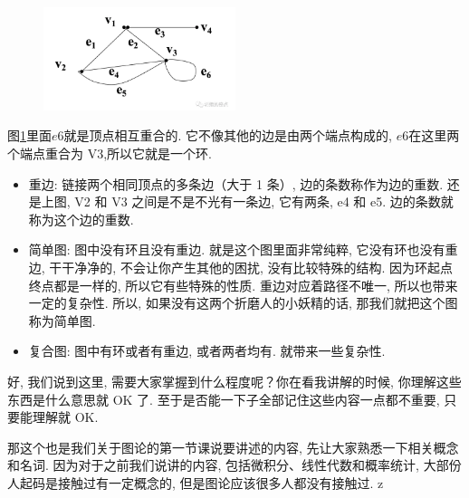 \begin{figure}[ht]
  \centering
  \includegraphics[width=0.5\textwidth]{asset/20231227144939.png}
  \caption{}
  \label{fig:img24_8}
\end{figure}

图\ref{fig:img24_8}里面$e6$就是顶点相互重合的. 它不像其他的边是由两个端点构成的, $e6$在这里两个端点重合为 V3,所以它就是一个环. 

\begin{itemize}
  \item 重边: 链接两个相同顶点的多条边（大于 1 条）, 边的条数称作为边的重数. 还是上图, V2 和 V3 之间是不是不光有一条边, 它有两条, e4 和 e5. 边的条数就称为这个边的重数. 
  \item 简单图: 图中没有环且没有重边. 就是这个图里面非常纯粹, 它没有环也没有重边, 干干净净的, 不会让你产生其他的困扰, 没有比较特殊的结构. 因为环起点终点都是一样的, 所以它有些特殊的性质. 重边对应着路径不唯一, 所以也带来一定的复杂性. 所以, 如果没有这两个折磨人的小妖精的话, 那我们就把这个图称为简单图. 
  \item 复合图: 图中有环或者有重边, 或者两者均有. 就带来一些复杂性. 
\end{itemize}

好, 我们说到这里, 需要大家掌握到什么程度呢？你在看我讲解的时候, 你理解这些东西是什么意思就 OK 了. 至于是否能一下子全部记住这些内容一点都不重要, 只要能理解就 OK. 

那这个也是我们关于图论的第一节课说要讲述的内容, 先让大家熟悉一下相关概念和名词. 因为对于之前我们说讲的内容, 包括微积分、线性代数和概率统计, 大部份人起码是接触过有一定概念的, 但是图论应该很多人都没有接触过. z